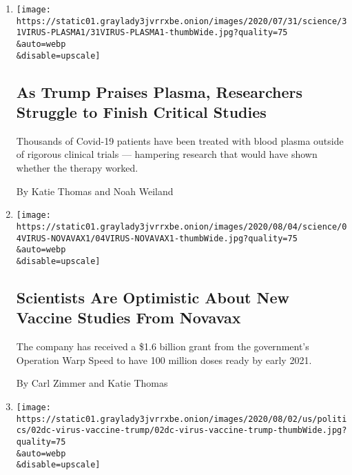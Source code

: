 \begin{enumerate}
\def\labelenumi{\arabic{enumi}.}
\item
  \href{/2020/08/04/health/trump-plasma.html}{}

  \texttt{[image: https://static01.graylady3jvrrxbe.onion/images/2020/07/31/science/31VIRUS-PLASMA1/31VIRUS-PLASMA1-thumbWide.jpg?quality=75\\\&auto=webp\\\&disable=upscale]}

  \hypertarget{as-trump-praises-plasma-researchers-struggle-to-finish-critical-studies}{%
  \subsection{As Trump Praises Plasma, Researchers Struggle to Finish
  Critical
  Studies}\label{as-trump-praises-plasma-researchers-struggle-to-finish-critical-studies}}

  Thousands of Covid-19 patients have been treated with blood plasma
  outside of rigorous clinical trials --- hampering research that would
  have shown whether the therapy worked.

  By Katie Thomas and Noah Weiland
\item
  \href{/2020/08/04/health/covid-19-vaccine-novavax.html}{}

  \texttt{[image: https://static01.graylady3jvrrxbe.onion/images/2020/08/04/science/04VIRUS-NOVAVAX1/04VIRUS-NOVAVAX1-thumbWide.jpg?quality=75\\\&auto=webp\\\&disable=upscale]}

  \hypertarget{scientists-are-optimistic-about-new-vaccine-studies-from-novavax}{%
  \subsection{Scientists Are Optimistic About New Vaccine Studies From
  Novavax}\label{scientists-are-optimistic-about-new-vaccine-studies-from-novavax}}

  The company has received a \$1.6 billion grant from the government's
  Operation Warp Speed to have 100 million doses ready by early 2021.

  By Carl Zimmer and Katie Thomas
\item
  \href{/2020/08/02/us/politics/coronavirus-vaccine.html}{}

  \texttt{[image: https://static01.graylady3jvrrxbe.onion/images/2020/08/02/us/politics/02dc-virus-vaccine-trump/02dc-virus-vaccine-trump-thumbWide.jpg?quality=75\\\&auto=webp\\\&disable=upscale]}

  \hypertarget{scientists-worry-about-political-influence-over-coronavirus-vaccine-project}{%
}
\end{enumerate}
